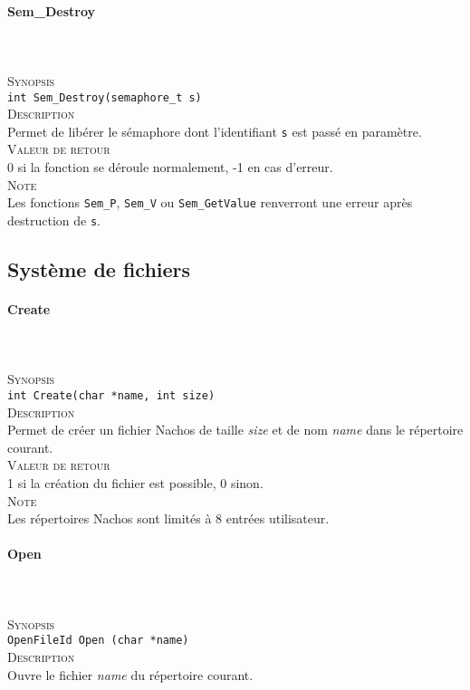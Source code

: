 \documentclass{report}
\newcommand{\myparagraph}[1]{\paragraph*{#1}\mbox{}\\}
\begin{document}
\myparagraph{Sem\_Destroy}\\
\textsc{Synopsis}\\	
	\texttt{int Sem\_Destroy(semaphore\_t s)}\\

\textsc{Description}\\
	Permet de libérer le sémaphore dont l'identifiant \texttt{s} est passé en paramètre.\\

\textsc{Valeur de retour}\\
0 si la fonction se déroule normalement, -1 en cas d'erreur.\\
	
\textsc{Note}\\
	Les fonctions \texttt{Sem\_P}, \texttt{Sem\_V} ou \texttt{Sem\_GetValue} renverront une erreur après destruction de \texttt{s}.\\
\newpage

\subsection*{Système de fichiers}
\myparagraph{Create}\\

\textsc{Synopsis}\\	
	\texttt{int Create(char *name, int size)}\\
	
\textsc{Description}\\
	Permet de créer un fichier Nachos de taille \textit{size} et de nom \textit{name} dans le répertoire courant.\\	

\textsc{Valeur de retour}\\
1 si la création du fichier est possible, 0 sinon.\\

\textsc{Note}\\
	Les répertoires Nachos sont limités à 8 entrées utilisateur.\\
\myparagraph{Open}\\

\textsc{Synopsis}\\	
	\texttt{OpenFileId Open (char *name)}\\
	
\textsc{Description}\\
	Ouvre le fichier \textit{name} du répertoire courant.\\	
\end{document}

